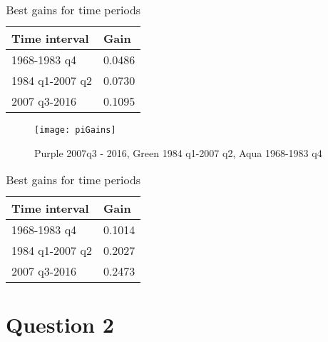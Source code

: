 \documentclass[]{article}
\begin{document}
	\begin{table}[H]
		\centering
		\begin{tabular}{ll}
			Time interval & Gain \\ 
			\hline 
			1968-1983 q4 &	0.0486  \\
			1984 q1-2007 q2 &  0.0730   \\
			2007 q3-2016 & 0.1095 \\
			\hline
		\end{tabular}
				\caption{Best gains for time periods}
	\end{table}	
	
	
	\begin{figure}[H]
		\centering
		\texttt{[image: piGains]}
		\caption{Purple 2007q3 - 2016, Green 1984 q1-2007 q2, Aqua 1968-1983 q4}
	\end{figure}	

	
	\begin{table}[H]
		\centering
		\begin{tabular}{ll}
			Time interval & Gain \\ 
			\hline 
			1968-1983 q4 &	  0.1014  \\
			1984 q1-2007 q2 &    0.2027  \\
			2007 q3-2016 &   0.2473 \\
			\hline
		\end{tabular}
		\caption{Best gains for time periods}
	\end{table}	
	
	\section*{Question 2}
\end{document}
